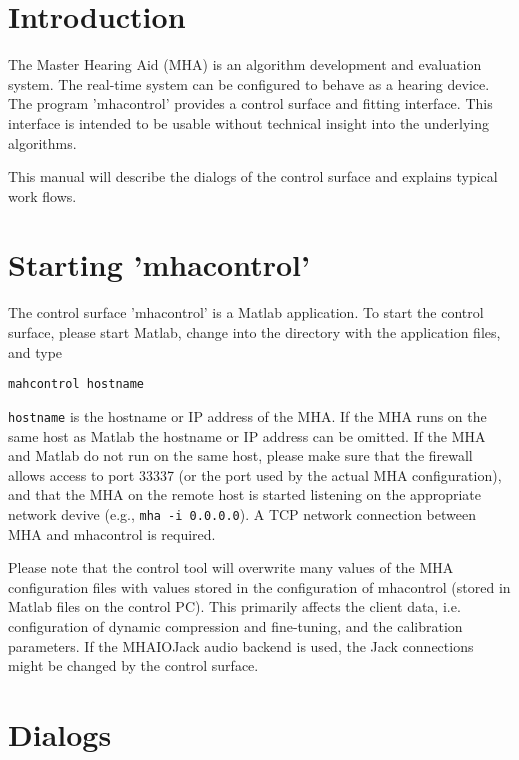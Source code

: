 \documentclass[11pt,a4paper,twoside]{article}
\begin{document}
\newpage
\MHAcopyright{}
\newpage
\tableofcontents
\newpage
\renewcommand{\leftmark}{\rightmark}

\section{Introduction}

The Master Hearing Aid (MHA) is an algorithm development and evaluation
system.
%
The real-time system can be configured to behave as a hearing device.
%
The program 'mhacontrol' provides a control surface and fitting
interface.
%
This interface is intended to be usable without technical insight into
the underlying algorithms.

This manual will describe the dialogs of the control surface and
explains typical work flows.

\section{Starting 'mhacontrol'}

The control surface 'mhacontrol' is a Matlab
application.
%
To start the control surface, please start Matlab, change into the
directory with the application files, and type
%
\begin{verbatim}
mahcontrol hostname
\end{verbatim}
%
\verb!hostname! is the hostname or IP address of the MHA.
%
If the MHA runs on the same host as Matlab the hostname or IP address
can be omitted.
%
If the MHA and Matlab do not run on the same host, please make sure
that the firewall allows access to port
33337 (or the port used by the actual MHA configuration), and that the
MHA on the remote host is started listening on the appropriate network
devive (e.g., \verb!mha -i 0.0.0.0!).
%
A TCP network connection between MHA and mhacontrol is required.

Please note that the control tool will overwrite many values of the
MHA configuration files with values stored in the configuration of
mhacontrol (stored in Matlab files on the control PC).
%
This primarily affects the client data, i.e. configuration of dynamic
compression and fine-tuning, and the calibration parameters.
%
If the MHAIOJack audio backend is used, the Jack connections might be
changed by the control surface.

\section{Dialogs}
\end{document}
